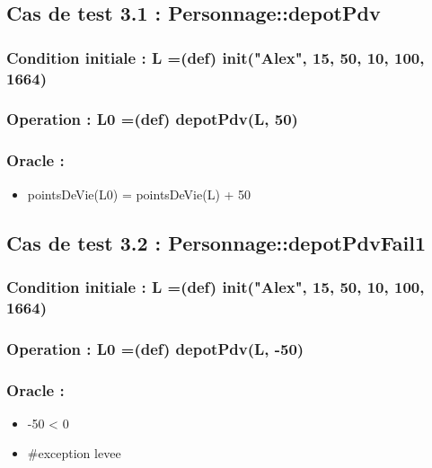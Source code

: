 \documentclass[11pt]{article}
\begin{document}
\subsection{Cas de test 3.1 : Personnage::depotPdv}
\label{sec-1.7}

\subsubsection{Condition initiale :  L =(def) init("Alex", 15, 50, 10, 100, 1664)}
\label{sec-1.7.1}

\subsubsection{Operation : L0 =(def) depotPdv(L, 50)}
\label{sec-1.7.2}

\subsubsection{Oracle :}
\label{sec-1.7.3}

\begin{itemize}

\item pointsDeVie(L0) = pointsDeVie(L) + 50\\
\label{sec-1.7.3.1}


\end{itemize} %
\subsection{Cas de test 3.2 : Personnage::depotPdvFail1}
\label{sec-1.8}

\subsubsection{Condition initiale :  L =(def) init("Alex", 15, 50, 10, 100, 1664)}
\label{sec-1.8.1}

\subsubsection{Operation : L0 =(def) depotPdv(L, -50)}
\label{sec-1.8.2}

\subsubsection{Oracle :}
\label{sec-1.8.3}

\begin{itemize}

\item -50 < 0\\
\label{sec-1.8.3.1}


\item \#exception levee\\
\label{sec-1.8.3.2}






\end{itemize} %
\end{document}
